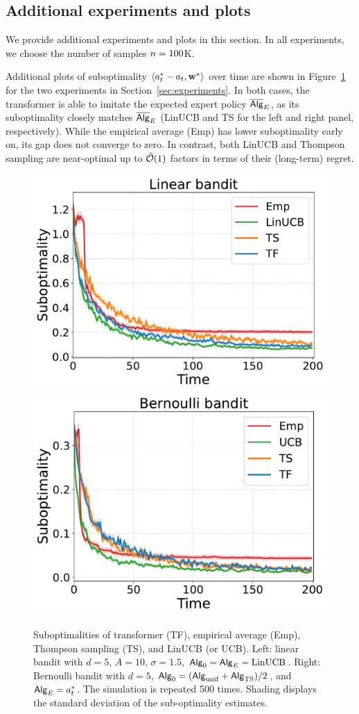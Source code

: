 \subsection{Additional experiments and plots}
We provide additional experiments and plots in this section. In all experiments, we choose the number of samples ${n}=100$K. 


Additional plots of suboptimality $\left\langle{a}_t^*-{a}_t,{\mathbf w}^*\right\rangle$ over time are shown in Figure~\ref{fig:subopt_1} for the two experiments in Section~\ref{sec:experiments}. In both cases, the transformer is able to imitate the expected expert policy $\overline{\mathsf{Alg}}_{{E}}$, as its suboptimality closely matches   $\overline{\mathsf{Alg}}_{{E}}$ (LinUCB and TS for the left and right panel, respectively).  While the empirical average (Emp) has lower suboptimality early on, its gap does not converge to zero. In contrast, both LinUCB and Thompson sampling are near-optimal up to ${\tilde{\mathcal O}}(1)$ factors in terms of their (long-term) regret. 

\begin{figure}[ht]
\centering  %
\includegraphics[width=0.46\linewidth]{Sections/figs/record_2_cum_False.pdf}
\includegraphics[width=0.45\linewidth]{Sections/figs/record_1_cum_False.pdf}
\caption{Suboptimalities of transformer (TF), empirical average (Emp), Thompson sampling (TS), and LinUCB (or UCB). Left: linear bandit with $d=5$, $A=10$, $\sigma=1.5$, ${\mathsf{Alg}}_0={\mathsf{Alg}}_{E}={\mathrm{LinUCB}}$. Right: Bernoulli bandit with $d=5$, ${\mathsf{Alg}}_0=({\mathsf{Alg}}_{\mathrm{unif}}+{\mathsf{Alg}}_{{\mathrm{TS}}})/2$, and ${\mathsf{Alg}}_{E}={a}_t^*$. The simulation is repeated 500 times. Shading displays the standard deviation of the sub-optimality estimates. %
} 
\label{fig:subopt_1} 
\end{figure}


